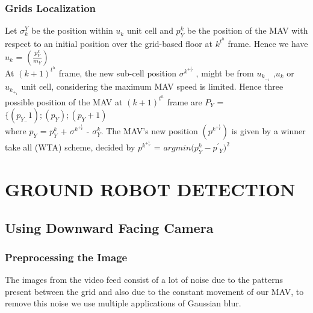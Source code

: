 \documentclass[12pt]{article}
\begin{document}
\subsubsection{Grids Localization}
Let $\sigma_k^Y$ be  the  position  within $u_k$ unit  cell  and $p^k_Y$ be  the position  of  the  MAV  with  respect  to  an  initial  position  over the grid-based floor at $k^t^h$ frame. Hence we have \\
$u_k$ = $\left(\frac{p^k_Y}{m_Y}\right)$ \\
At $(k + 1)^t^h$ frame, the new sub-cell position $\sigma^k^+^1_Y$ , might be from $u_k_-_1$ ,$u_k$ or $u_k_+_1$ unit cell, considering the maximum MAV speed is limited. Hence three possible position of the MAV at $(k + 1)^t^h$ frame are $P_Y$ = $\{(p_Y_- 1);(p_Y);(p_Y + 1)$ \\
where $p_Y$ = $p^k_Y$ + $\sigma^k^+^1_Y$ - $\sigma^k_Y$. The MAV’s new position $(p^k^+^1_Y)$ is given by a winner take all (WTA) scheme, decided by $p^k^+^1_Y$ = $argmin(p^k_Y - p^'$$_Y )^2$ 
\section{GROUND ROBOT DETECTION}
    \subsection{Using Downward Facing Camera}
    	 \subsubsection{Preprocessing the Image}
            The images from the video feed consist of a lot of noise due to the patterns present between the grid and also due to the constant movement of our MAV, to remove this noise we use multiple applications of Gaussian blur.
\end{document}
